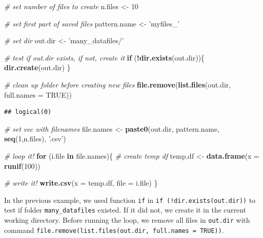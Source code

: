 \documentclass[11pt,]{book}
\newenvironment{Shaded}{\begin{snugshade}}{\end{snugshade}}
\newcommand{\KeywordTok}[1]{\textcolor[rgb]{0.27,0.27,0.27}{\textbf{#1}}}
\newcommand{\DataTypeTok}[1]{\textcolor[rgb]{0.27,0.27,0.27}{#1}}
\newcommand{\DecValTok}[1]{\textcolor[rgb]{0.06,0.06,0.06}{#1}}
\newcommand{\StringTok}[1]{\textcolor[rgb]{0.5,0.5,0.5}{#1}}
\newcommand{\CommentTok}[1]{\textcolor[rgb]{0.56,0.35,0.01}{\textit{#1}}}
\newcommand{\OtherTok}[1]{\textcolor[rgb]{0.56,0.35,0.01}{#1}}
\newcommand{\ControlFlowTok}[1]{\textcolor[rgb]{0.13,0.29,0.53}{\textbf{#1}}}
\newcommand{\OperatorTok}[1]{\textcolor[rgb]{0.81,0.36,0.00}{\textbf{#1}}}
\newcommand{\NormalTok}[1]{#1}
\begin{document}
\begin{Shaded}
\begin{Highlighting}[]
\CommentTok{# set number of files to create}
\NormalTok{n.files <-}\StringTok{ }\DecValTok{10}

\CommentTok{# set first part of saved files}
\NormalTok{pattern.name <-}\StringTok{ 'myfiles_'}

\CommentTok{# set dir}
\NormalTok{out.dir <-}\StringTok{ 'many_datafiles/'}

\CommentTok{# test if out.dir exists, if not, create it}
\ControlFlowTok{if}\NormalTok{ (}\OperatorTok{!}\KeywordTok{dir.exists}\NormalTok{(out.dir))\{}
  \KeywordTok{dir.create}\NormalTok{(out.dir)   }
\NormalTok{\} }

\CommentTok{# clean up folder before creating new files}
\KeywordTok{file.remove}\NormalTok{(}\KeywordTok{list.files}\NormalTok{(out.dir, }\DataTypeTok{full.names =} \OtherTok{TRUE}\NormalTok{)) }
\end{Highlighting}
\end{Shaded}

\begin{verbatim}
## logical(0)
\end{verbatim}

\begin{Shaded}
\begin{Highlighting}[]
\CommentTok{# set vec with filenames}
\NormalTok{file.names <-}\StringTok{ }\KeywordTok{paste0}\NormalTok{(out.dir, pattern.name, }\KeywordTok{seq}\NormalTok{(}\DecValTok{1}\NormalTok{,n.files), }\StringTok{'.csv'}\NormalTok{)}

\CommentTok{# loop it!}
\ControlFlowTok{for}\NormalTok{ (i.file }\ControlFlowTok{in}\NormalTok{ file.names)\{}
  \CommentTok{# create temp df}
\NormalTok{  temp.df <-}\StringTok{ }\KeywordTok{data.frame}\NormalTok{(}\DataTypeTok{x =} \KeywordTok{runif}\NormalTok{(}\DecValTok{100}\NormalTok{))}
  
  \CommentTok{# write it!}
  \KeywordTok{write.csv}\NormalTok{(}\DataTypeTok{x =}\NormalTok{ temp.df, }\DataTypeTok{file =}\NormalTok{ i.file)}
\NormalTok{\}}
\end{Highlighting}
\end{Shaded}

In the previous example, we used function \texttt{if} in
\texttt{if\ (!dir.exists(out.dir))} to test if folder
\texttt{many\_datafiles} existed. If it did not, we create it in the
current working directory. Before running the loop, we remove all files
in \texttt{out.dir} with command
\texttt{file.remove(list.files(out.dir,\ full.names\ =\ TRUE))}.
\end{document}
